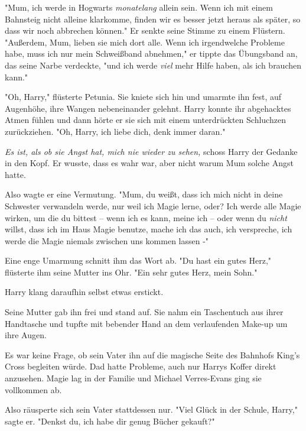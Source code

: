 {"Mum, ich werde in Hogwarts \emph{monatelang} allein sein. Wenn ich mit einem Bahnsteig nicht alleine klarkomme, finden wir es besser jetzt heraus als später, so dass wir noch abbrechen können." Er senkte seine Stimme zu einem Flüstern. "Außerdem, Mum, lieben sie mich dort alle. Wenn ich irgendwelche Probleme habe, muss ich nur mein Schweißband abnehmen," er tippte das Übungsband an, das seine Narbe verdeckte, "und ich werde \emph{viel} mehr Hilfe haben, als ich brauchen kann."

"Oh, Harry," flüsterte Petunia. Sie kniete sich hin und umarmte ihn fest, auf Augenhöhe, ihre Wangen nebeneinander gelehnt. Harry konnte ihr abgehacktes Atmen fühlen und dann hörte er sie sich mit einem unterdrückten Schluchzen zurückziehen. "Oh, Harry, ich liebe dich, denk immer daran."

\emph{Es ist, als ob sie Angst hat, mich nie wieder zu sehen,} schoss Harry der Gedanke in den Kopf. Er wusste, dass es wahr war, aber nicht warum Mum solche Angst hatte.

Also wagte er eine Vermutung. "Mum, du weißt, dass ich mich nicht in deine Schwester verwandeln werde, nur weil ich Magie lerne, oder? Ich werde alle Magie wirken, um die du bittest -- wenn ich es kann, meine ich -- oder wenn du \emph{nicht} willst, dass ich im Haus Magie benutze, mache ich das auch, ich verspreche, ich werde die Magie niemals zwischen uns kommen lassen -"

Eine enge Umarmung schnitt ihm das Wort ab. "Du hast ein gutes Herz," flüsterte ihm seine Mutter ins Ohr. "Ein sehr gutes Herz, mein Sohn."

Harry klang daraufhin selbst etwas erstickt.

Seine Mutter gab ihn frei und stand auf. Sie nahm ein Taschentuch aus ihrer Handtasche und tupfte mit bebender Hand an dem verlaufenden Make-up um ihre Augen.

Es war keine Frage, ob sein Vater ihn auf die magische Seite des Bahnhofs King's Cross begleiten würde. Dad hatte Probleme, auch nur Harrys Koffer direkt anzusehen. Magie lag in der Familie und Michael Verres-Evans ging sie vollkommen ab.

Also räusperte sich sein Vater stattdessen nur. "Viel Glück in der Schule, Harry," sagte er. "Denkst du, ich habe dir genug Bücher gekauft?"

}
